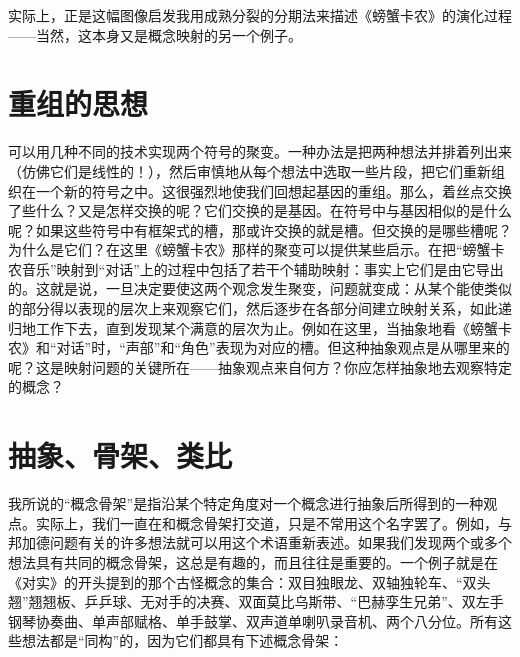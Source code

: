 \begin{figure}
\caption[两条同源的染色体，中间通过着丝点相互联接。]
  {}
\end{figure}

实际上，正是这幅图像启发我用成熟分裂的分期法来描述《螃蟹卡农》的演化过程——当然，这本身又是概念映射的另一个例子。

\section{重组的思想}

可以用几种不同的技术实现两个符号的聚变。一种办法是把两种想法并排着列出来（仿佛它们是线性的！），然后审慎地从每个想法中选取一些片段，把它们重新组织在一个新的符号之中。这很强烈地使我们回想起基因的重组。那么，着丝点交换了些什么？又是怎样交换的呢？它们交换的是基因。在符号中与基因相似的是什么呢？如果这些符号中有框架式的槽，那或许交换的就是槽。但交换的是哪些槽呢？为什么是它们？在这里《螃蟹卡农》那样的聚变可以提供某些启示。在把“螃蟹卡农音乐”映射到“对话”上的过程中包括了若干个辅助映射：事实上它们是由它导出的。这就是说，一旦决定要使这两个观念发生聚变，问题就变成：从某个能使类似的部分得以表现的层次上来观察它们，然后逐步在各部分间建立映射关系，如此递归地工作下去，直到发现某个满意的层次为止。例如在这里，当抽象地看《螃蟹卡农》和“对话”时，“声部”和“角色”表现为对应的槽。但这种抽象观点是从哪里来的呢？这是映射问题的关键所在——抽象观点来自何方？你应怎样抽象地去观察特定的概念？

\section{抽象、骨架、类比}

我所说的“概念骨架”是指沿某个特定角度对一个概念进行抽象后所得到的一种观点。实际上，我们一直在和概念骨架打交道，只是不常用这个名字罢了。例如，与邦加德问题有关的许多想法就可以用这个术语重新表述。如果我们发现两个或多个想法具有共同的概念骨架，这总是有趣的，而且往往是重要的。一个例子就是在《对实》的开头提到的那个古怪概念的集合：双目独眼龙、双轴独轮车、“双头翘”翘翘板、乒乒球、无对手的决赛、双面莫比乌斯带、“巴赫孪生兄弟”、双左手钢琴协奏曲、单声部赋格、单手鼓掌、双声道单喇叭录音机、两个八分位。所有这些想法都是“同构”的，因为它们都具有下述概念骨架：

